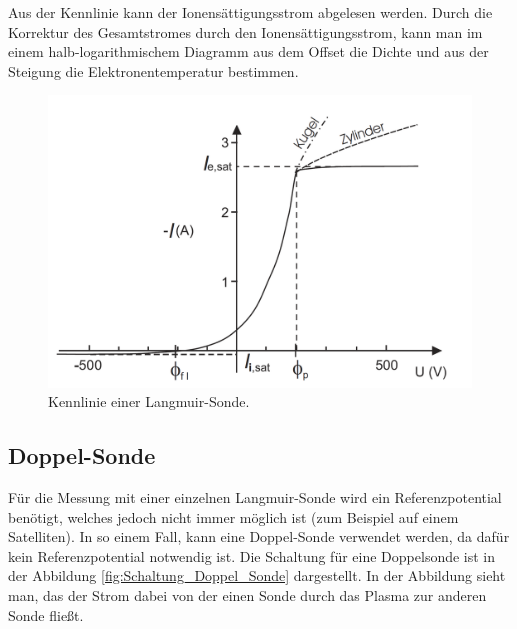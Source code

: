 Aus der Kennlinie kann der Ionensättigungsstrom abgelesen werden. Durch die Korrektur des Gesamtstromes durch den Ionensättigungsstrom, kann man im einem halb-logarithmischem Diagramm aus dem Offset die  Dichte und aus der Steigung die Elektronentemperatur bestimmen. 
\begin{figure}[H]
\centering
\includegraphics[scale=0.4]{Kennlinie_Sonde.png}
\caption{Kennlinie einer Langmuir-Sonde. \cite{anleitung}}
\label{fig:Kennlinie_Sonde}
\end{figure}
\subsection{Doppel-Sonde}
Für die Messung mit einer einzelnen Langmuir-Sonde wird ein Referenzpotential benötigt, welches jedoch nicht immer möglich ist (zum Beispiel auf einem Satelliten). In so einem Fall, kann eine Doppel-Sonde \cite{anleitung} verwendet werden, da dafür kein Referenzpotential notwendig ist. Die Schaltung für eine Doppelsonde ist in der Abbildung \ref{fig:Schaltung_Doppel_Sonde} dargestellt. In der Abbildung sieht man, das der Strom dabei von der einen Sonde durch das Plasma zur anderen Sonde fließt. 

